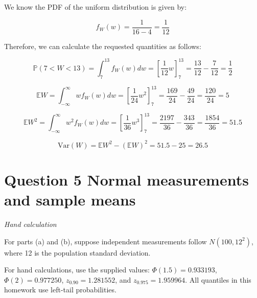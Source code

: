 \documentclass[11pt]{article}
\begin{document}
\begin{enumerate}[label=\textbf{(\alph*)}]
  We know the PDF of the uniform distribution is given by:
  
  \[
  f_W(w) = \frac{1}{16-4} = \frac{1}{12}
  \]

  Therefore, we can calculate the requested quantities as follows:

  \[
  \mathbb{P}(7 < W < 13) = \int_{7}^{13} f_W(w) dw = [\frac{1}{12}w]_7^{13} = \frac{13}{12} - \frac{7}{12} = \frac{1}{2}
  \]

  \[
  \mathbb{E}W = \int_{-\infty}^{\infty} wf_W(w) dw = [\frac{1}{24}w^2]_7^{13} = \frac{169}{24} - \frac{49}{24} = \frac{120}{24} = 5
  \]

  \[
    \mathbb{E}W^2 = \int_{-\infty}^{\infty} w^2f_W(w) dw = [\frac{1}{36}w^3]_7^{13} = \frac{2197}{36} - \frac{343}{36} = \frac{1854}{36} = 51.5
  \]

  \[
  \text{Var}(W) = \mathbb{E}W^2 - (\mathbb{E}W)^2 = 51.5 - 25 = 26.5
  \]



\end{enumerate}

\newpage
\section*{Question 5 \quad Normal measurements and sample means}
\textit{Hand calculation}

For parts (a) and (b), suppose independent measurements follow $N(100, 12^2)$, where 12 is the population standard deviation.

For hand calculations, use the supplied values: $\Phi(1.5) = 0.933193$, $\Phi(2) = 0.977250$, $z_{0.90} = 1.281552$, and $z_{0.975} = 1.959964$. All quantiles in this homework use left-tail probabilities.
\end{document}
